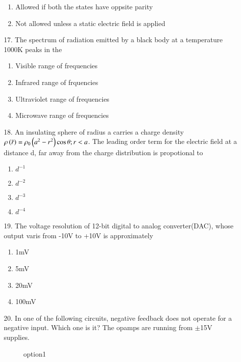 \documentclass[journal]{IEEEtran}
\begin{document}
\begin{enumerate}
\begin{enumerate}[label=(\Alph*)]
        \item Allowed if both the states have oppsite parity
        \item Not allowed unless a static electric field is applied
    \end{enumerate}
    \item[17.] The spectrum of radiation emitted by a black body at a temperature 1000K peaks in the
    \begin{enumerate}[label=(\Alph*)]
        \item Visible range of frequencies 
        \item Infrared range of frquencies 
        \item Ultraviolet range of frequencies
        \item Microwave range of frequencies
    \end{enumerate}
    \item[18.] An insulating sphere of radius a carries a charge density $\rho \left(\bar{r}\right)=\rho_0\left(a^2-r^2\right)\cos\theta; r<a$. The leading order term for the electric field at a distance d, far away from the charge distribution is propotional to
    \begin{enumerate}[label=(\Alph*)]
        \item $d^{-1}$
        \item $d^{-2}$
        \item $d^{-3}$
        \item $d^{-4}$
    \end{enumerate}
    \item[19.] The voltage resolution of 12-bit digital to analog converter(DAC), whose output varis from -10V to +10V is approximately
    \begin{enumerate}[label=(\Alph*)]
        \item 1mV
        \item 5mV
        \item 20mV
        \item 100mV
    \end{enumerate}
    \item[20.] In one of the following circuits, negative feedback does not operate for a negative input. Which one is it? The opamps are running from $\pm$15V supplies.
    \begin{figure}[!ht]
        \centering
        \caption{option1}
    \end{figure}
    \begin{figure}[!ht]

\end{figure}
\end{enumerate}
\end{document}
